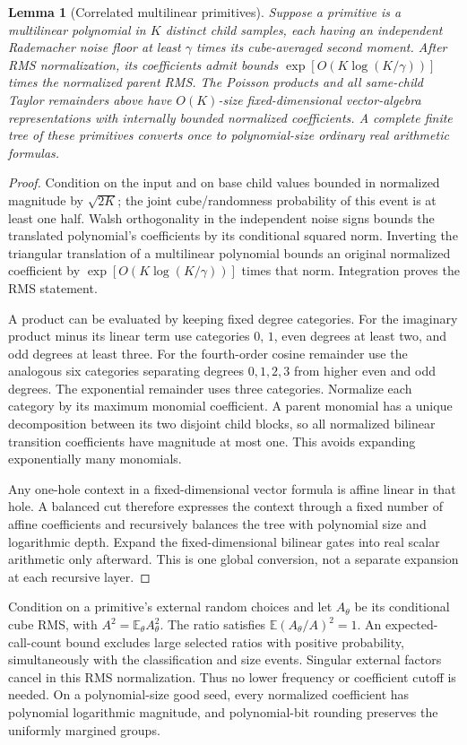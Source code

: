 \documentclass[11pt]{article}
\newtheorem{lemma}[theorem]{Lemma}
\newcommand{\E}{\mathbb E}
\begin{document}
\begin{lemma}[Correlated multilinear primitives]
\label{lem:precision}
Suppose a primitive is a multilinear polynomial in $K$ distinct child samples, each having an independent Rademacher noise floor at least $\gamma$ times its cube-averaged second moment. After RMS normalization, its coefficients admit bounds $\exp[O(K\log(K/\gamma))]$ times the normalized parent RMS. The Poisson products and all same-child Taylor remainders above have $O(K)$-size fixed-dimensional vector-algebra representations with internally bounded normalized coefficients. A complete finite tree of these primitives converts once to polynomial-size ordinary real arithmetic formulas.
\end{lemma}
\begin{proof}
Condition on the input and on base child values bounded in normalized magnitude by $\sqrt{2K}$; the joint cube/randomness probability of this event is at least one half. Walsh orthogonality in the independent noise signs bounds the translated polynomial's coefficients by its conditional squared norm. Inverting the triangular translation of a multilinear polynomial bounds an original normalized coefficient by $\exp[O(K\log(K/\gamma))]$ times that norm. Integration proves the RMS statement.

A product can be evaluated by keeping fixed degree categories. For the imaginary product minus its linear term use categories $0$, $1$, even degrees at least two, and odd degrees at least three. For the fourth-order cosine remainder use the analogous six categories separating degrees $0,1,2,3$ from higher even and odd degrees. The exponential remainder uses three categories. Normalize each category by its maximum monomial coefficient. A parent monomial has a unique decomposition between its two disjoint child blocks, so all normalized bilinear transition coefficients have magnitude at most one. This avoids expanding exponentially many monomials.

Any one-hole context in a fixed-dimensional vector formula is affine linear in that hole. A balanced cut therefore expresses the context through a fixed number of affine coefficients and recursively balances the tree with polynomial size and logarithmic depth. Expand the fixed-dimensional bilinear gates into real scalar arithmetic only afterward. This is one global conversion, not a separate expansion at each recursive layer.
\end{proof}

Condition on a primitive's external random choices and let $A_\theta$ be its conditional cube RMS, with $A^2=\E_\theta A_\theta^2$. The ratio satisfies $\E(A_\theta/A)^2=1$. An expected-call-count bound excludes large selected ratios with positive probability, simultaneously with the classification and size events. Singular external factors cancel in this RMS normalization. Thus no lower frequency or coefficient cutoff is needed. On a polynomial-size good seed, every normalized coefficient has polynomial logarithmic magnitude, and polynomial-bit rounding preserves the uniformly margined groups.
\end{document}

